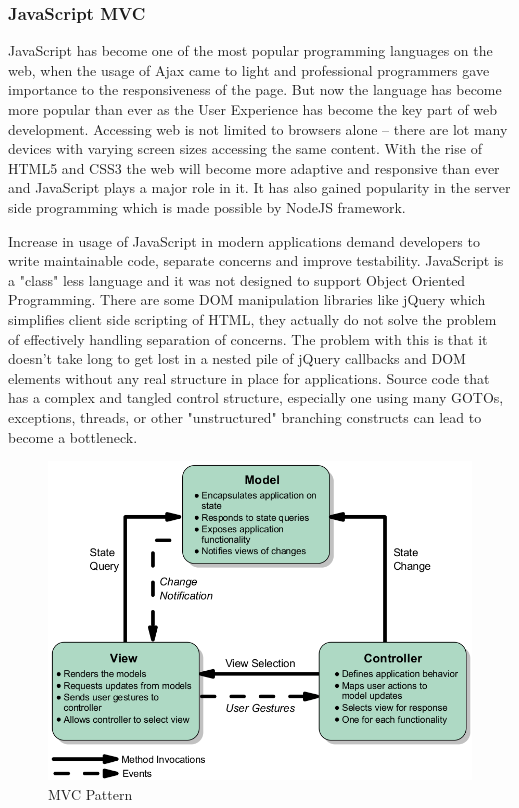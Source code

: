   \subsubsection{JavaScript MVC}
    JavaScript has become one of the most popular programming languages on the web, when the usage of Ajax came to light and professional programmers gave importance to the responsiveness of the page. But now the language has become more popular than ever as the User Experience has become the key part of web development. Accessing web is not limited to browsers alone – there are lot many devices with varying screen sizes accessing the same content. With the rise of HTML5 and CSS3 the web will become more adaptive and responsive than ever and JavaScript plays a major role in it. It has also gained popularity in the server side programming which is made possible by NodeJS framework.

    Increase in usage of JavaScript in modern applications demand developers to write maintainable code, separate concerns and improve testability. JavaScript is a "class" less language and it was not designed to support Object Oriented Programming. There are some DOM manipulation libraries like jQuery which simplifies client side scripting of HTML, they actually do not solve the problem of effectively handling separation of concerns. The problem with this is that it doesn’t take long to get lost in a nested pile of jQuery callbacks and DOM elements without any real structure in place for applications. Source code that has a complex and tangled control structure, especially one using many GOTOs, exceptions, threads, or other "unstructured" branching constructs can lead to become a bottleneck. 
     \begin{figure}[!ht]
     \centering
     \includegraphics[scale=0.5]{images/MVCPattern.png}   
     \caption[MVC Pattern]{MVC Pattern}
     \label{img:MVCPattern}                           
     \end{figure}

